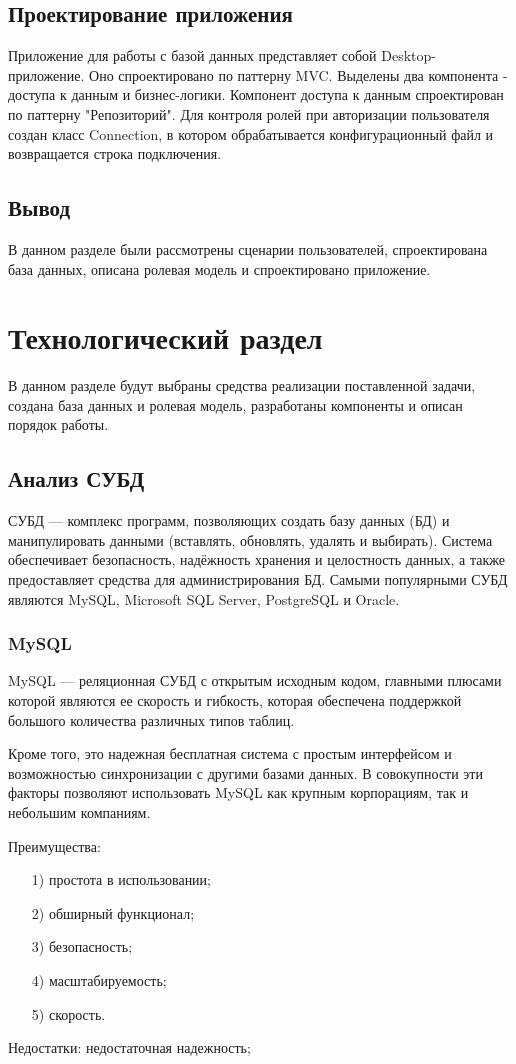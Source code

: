 \subsection{Проектирование приложения}
Приложение для работы с базой данных представляет собой Desktop-приложение. Оно спроектировано по паттерну MVC. Выделены два компонента - доступа к данным и бизнес-логики. Компонент доступа к данным спроектирован по паттерну "Репозиторий". Для контроля ролей при авторизации пользователя создан класс Connection, в котором обрабатывается конфигурационный файл и возвращается строка подключения. 
\subsection{Вывод}
В данном разделе были рассмотрены сценарии пользователей, спроектирована база данных, описана ролевая модель и спроектировано приложение.

\newpage
\section{Технологический раздел}
В данном разделе будут выбраны средства реализации поставленной задачи, создана база данных и ролевая модель, разработаны компоненты и описан порядок работы.
\subsection{Анализ СУБД}
СУБД — комплекс программ, позволяющих создать базу данных (БД) и манипулировать данными (вставлять, обновлять, удалять и выбирать). Система обеспечивает безопасность, надёжность хранения и целостность данных, а также предоставляет средства для администрирования БД. Самыми популярными СУБД являются MySQL, Microsoft SQL Server, PostgreSQL и Oracle.
\subsubsection{MySQL}
MySQL — реляционная СУБД с открытым исходным кодом, главными плюсами которой являются ее скорость и гибкость, которая обеспечена поддержкой большого количества различных типов таблиц.

Кроме того, это надежная бесплатная система с простым интерфейсом и возможностью синхронизации с другими базами данных. В совокупности эти факторы позволяют использовать MySQL как крупным корпорациям, так и небольшим компаниям.

Преимущества:
\begin{itemize}
	\item[1)] простота в использовании;
	\item[2)] обширный функционал;
	\item[3)] безопасность;
	\item[4)] масштабируемость;
	\item[5)] скорость.    
\end{itemize}
Недостатки: недостаточная надежность;
